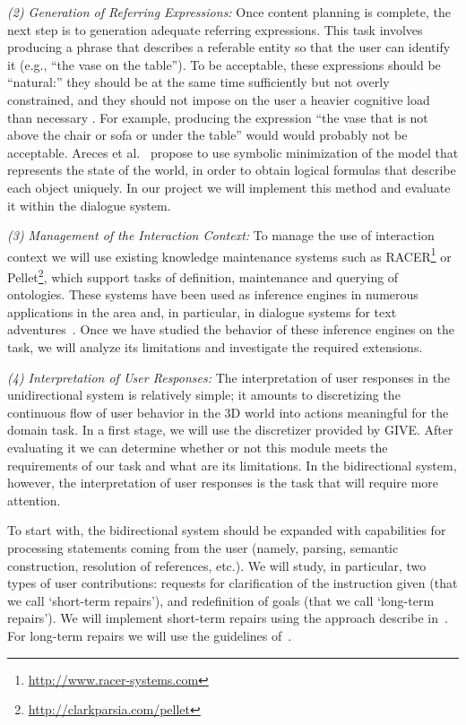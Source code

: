 \emph{(2) Generation of Referring Expressions:} Once content planning is
complete, the next step is to generation adequate referring expressions. 
This task involves producing a phrase that describes a referable entity so that the user can
identify it (e.g., ``the vase on the table''). To be
acceptable, these expressions should be ``natural:'' they should be at the same time
sufficiently but not overly constrained, and they should not impose on the user a heavier 
cognitive load than necessary . For example, producing the expression 
``the vase that is not above the chair or sofa or under the
table'' would would probably not be acceptable. Areces et al.~ propose to
use symbolic minimization of the model that represents the state of the world, in
order to obtain logical formulas that describe each object uniquely. In our
project we will implement this method and evaluate it within the dialogue system.

\emph{(3) Management of the Interaction Context:} To manage the use of
interaction context we will use existing knowledge maintenance systems such as
RACER\footnote{\url{http://www.racer-systems.com}} or Pellet\footnote{\url{http://clarkparsia.com/pellet}}, which support tasks of
definition, maintenance and querying of ontologies. These systems have been used
as inference engines in numerous applications in
the area and, in particular, in dialogue systems for text adventures~\cite{benotti09b}. Once we
have studied the behavior of these inference engines on the task, we will
analyze its limitations and investigate the required extensions.

\emph{(4) Interpretation of User Responses:} The interpretation of user
responses in the unidirectional system is relatively simple; it amounts to
discretizing the continuous flow of user behavior in the 3D world into actions
meaningful for the domain task. In a first
stage, we will use the discretizer provided by GIVE. After evaluating it we can
determine whether or not this module meets the requirements of
our task and what are its limitations. In the bidirectional system, however,
the interpretation of user responses is the task that will require more
attention.

To start with, the bidirectional system should be expanded with capabilities
for  processing statements coming from the user (namely, parsing, semantic
construction, resolution of references, etc.). We will study, in particular, two
types of user contributions: requests for clarification of the instruction
given (that we call `short-term repairs'), and redefinition of goals (that we
call `long-term repairs'). We will implement short-term repairs
using the approach describe in~\cite{purver06}. For long-term repairs we will use the
guidelines of~\cite{blaylock05a}. 

